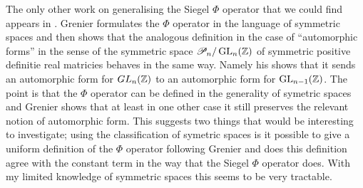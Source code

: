 The only other work on generalising the Siegel \(\Phi\) operator that we could find appears in \cite{grenierANALOGUESIEGELXOPERATOR2024}. 
Grenier formulates the \(\Phi\) operator in the language of symmetric spaces \cite[Ch. 2]{terrasHarmonicAnalysisSymmetric2016} and then shows that the analogous definition in the case of ``automorphic forms'' in the sense of the symmetric space \(\mathscr{P}_n/\GL_n(\Z)\) of symmetric positive definitie real matricies \cite[1.5.1]{terrasHarmonicAnalysisSymmetric2016} behaves in the same way. Namely his \cite[Thm. 2]{grenierAnalogueSiegelFOperator1992} shows that it sends an automorphic form for \(
GL_n(\Z)\) to an automorphic form for \(\GL_{n-1}(\Z)\). The point is that the \(\Phi\) operator can be defined in the generality of symetric spaces and Grenier shows that at least in one other case it still preserves the relevant notion of automorphic form. This suggests two things that would be interesting to investigate; using the classification of symetric spaces is it possible to give a uniform definition of the \(\Phi\) operator following Grenier and does this definition agree with the constant term in the way that the Siegel \(\Phi\) operator does. With my limited knowledge of symmetric spaces this seems to be very tractable.


